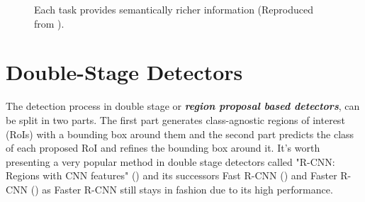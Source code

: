 \begin{figure}[!htb]
  \centering
  
  \caption{Each task provides semantically richer information (Reproduced from \cite{garcia1704review}).}
  \label{fig1}
\end{figure}

\section{Double-Stage Detectors}

The detection process in double stage or \textbf{\textit{region proposal based detectors}}, can be split in two parts. The first part generates class-agnostic regions of interest (RoIs) with a bounding box around them and the second part predicts the class of each proposed RoI and refines the bounding box around it. It's worth presenting a very popular method in double stage detectors called "R-CNN: Regions with CNN features" (\cite{girshick2014rich}) and its successors Fast R-CNN (\cite{girshick2015fast}) and Faster R-CNN (\cite{ren2015faster}) as Faster R-CNN still stays in fashion due to its high performance.

